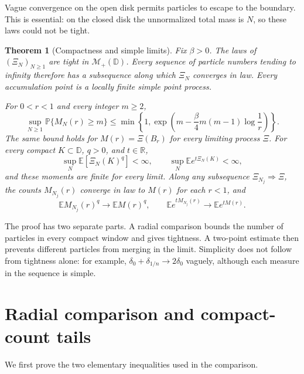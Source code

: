 \documentclass[11pt,a4paper]{article}
\numberwithin{equation}{section}
\newtheorem{theorem}{Theorem}[section]
\theoremstyle{remark}
\newcommand{\D}{\mathbb D}
\newcommand{\E}{\mathbb E}
\newcommand{\Prob}{\mathbb P}
\newcommand{\Mplus}{\mathcal M_+}
\begin{document}
Vague convergence on the open disk permits particles to escape to the
boundary. This is essential: on the closed disk the unnormalized total
mass is $N$, so these laws could not be tight.

\begin{theorem}[Compactness and simple limits]\label{thm:main}
Fix $\beta>0$.
The laws of $(\Xi_N)_{N\ge1}$ are tight in $\Mplus(\D)$.
Every sequence of particle numbers tending to infinity therefore has
a subsequence along which $\Xi_N$ converges in law.
Every accumulation point is a locally finite simple point process.

For $0<r<1$ and every integer $m\ge2$,
\begin{equation}\label{eq:tail}
 \sup_{N\ge1}\Prob\{M_N(r)\ge m\}
 \le \min\left\{1,
 \exp\left(m-\frac{\beta}{4}m(m-1)\log\frac1r\right)\right\}.
\end{equation}
The same bound holds for $M(r)=\Xi(B_r)$ for every limiting process
$\Xi$. For every compact $K\subset\D$, $q>0$, and $t\in\mathbb R$,
\[
 \sup_N\E[\Xi_N(K)^q]<\infty,\qquad
 \sup_N\E e^{t\Xi_N(K)}<\infty,
\]
and these moments are finite for every limit.
Along any subsequence $\Xi_{N_j}\Rightarrow\Xi$, the counts
$M_{N_j}(r)$ converge in law to $M(r)$ for each $r<1$, and
\begin{equation}\label{eq:moment-convergence}
 \E M_{N_j}(r)^q\longrightarrow\E M(r)^q,
 \qquad
 \E e^{tM_{N_j}(r)}\longrightarrow\E e^{tM(r)}.
\end{equation}
\end{theorem}

The proof has two separate parts. A radial comparison bounds the number
of particles in every compact window and gives tightness. A two-point
estimate then prevents different particles from merging in the limit.
Simplicity does not follow from tightness alone: for example,
$\delta_0+\delta_{1/n}\to2\delta_0$ vaguely, although each measure in
the sequence is simple.

\section{Radial comparison and compact-count tails}

We first prove the two elementary inequalities used in the comparison.
\end{document}

